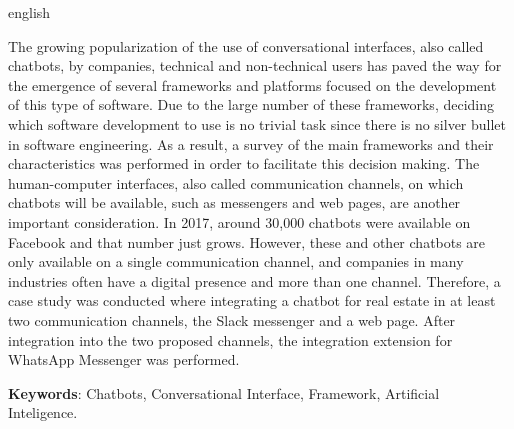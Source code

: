 \setlength{\absparsep}{18pt} %
\begin{resumo}[Abstract]
 \begin{otherlanguage*}{english}
   
The growing popularization of the use of conversational interfaces, also called chatbots, by companies, technical and non-technical users has paved the way for the emergence of several frameworks and platforms focused on the development of this type of software. Due to the large number of these frameworks, deciding which software development to use is no trivial task since there is no silver bullet in software engineering. As a result, a survey of the main frameworks and their characteristics was performed in order to facilitate this decision making. The human-computer interfaces, also called communication channels, on which chatbots will be available, such as messengers and web pages, are another important consideration. In 2017, around 30,000 chatbots were available on Facebook and that number just grows. However, these and other chatbots are only available on a single communication channel, and companies in many industries often have a digital presence and more than one channel. Therefore, a case study was conducted where integrating a chatbot for real estate  in at least two communication channels, the Slack messenger and a web page. After integration into the two proposed channels, the integration extension for WhatsApp Messenger was performed.

 
   \textbf{Keywords}: Chatbots, Conversational Interface, Framework, Artificial Inteligence.
 \end{otherlanguage*}
\end{resumo}